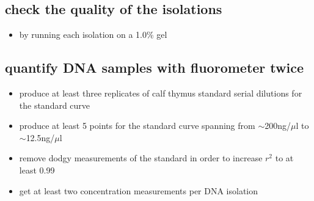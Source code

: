 \subsection{check the quality of the isolations}
\begin{itemize}
\item by running each isolation on a 1.0\% gel
\end{itemize}


\subsection
{quantify DNA samples with fluorometer twice}
\begin{itemize}
\item produce at least three replicates of calf thymus standard serial dilutions for the standard curve
\item produce at least 5 points for the standard curve spanning from $\sim$200ng/$\mu$l to $\sim$12.5ng/$\mu$l
\item remove dodgy measurements of the standard in order to increase $r^{2}$ to at least 0.99
\item get at least two concentration measurements per DNA isolation
\end{itemize}

